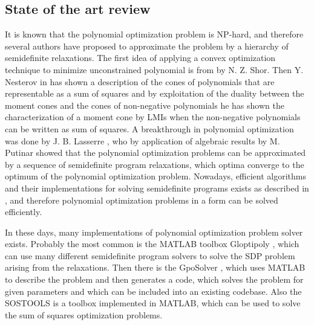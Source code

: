 \subsection{State of the art review}
It is known that the polynomial optimization problem  is NP-hard, and therefore several authors have proposed to approximate the problem  by a hierarchy of semidefinite relaxations.
The first idea of applying a convex optimization technique to minimize unconstrained polynomial is from \cite{shor} by N. Z. Shor.
Then Y. Nesterov in \cite{nesterov-2000} has shown a description of the cones of polynomials that are representable as a sum of squares and by exploitation of the duality between the moment cones and the cones of non-negative polynomials he has shown the characterization of a moment cone by LMIs when the non-negative polynomials can be written as sum of squares.
A breakthrough in polynomial optimization was done by J. B. Lasserre \cite{Lasserre}, who by application of algebraic results by M. Putinar \cite{putinar} showed that the polynomial optimization problems can be approximated by a sequence of semidefinite program relaxations, which optima converge to the optimum of the polynomial optimization problem.
Nowadays, efficient algorithms and their implementations for solving semidefinite programs exists as described in , and therefore polynomial optimization problems in a form  can be solved efficiently.

In these days, many implementations of polynomial optimization problem solver exists.
Probably the most common is the MATLAB toolbox Gloptipoly \cite{gloptipoly}, which can use many different semidefinite program solvers to solve the SDP problem arising from the relaxations.
Then there is the GpoSolver \cite{gposolver}, which uses MATLAB to describe the problem and then generates a \CC{} code, which solves the problem for given parameters and which can be included into an existing codebase.
Also the SOSTOOLS \cite{sostools} is a toolbox implemented in MATLAB, which can be used to solve the sum of squares optimization problems. 

